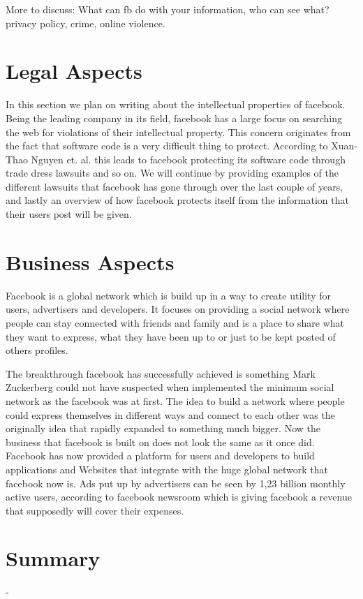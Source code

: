 \documentclass[conference]{IEEEtran}
\begin{document}
More to discuss:
What can fb do with your information, who can see what? privacy policy, crime,
online violence.

\section{Legal Aspects}
\label{legal}
In this section we plan on writing about the intellectual properties of
facebook. Being the leading company in its field, facebook has a large focus on
searching the web for violations of their intellectual property. This concern
originates from the fact that software code is a very difficult thing to
protect. According to  Xuan-Thao Nguyen et. al. this leads to facebook
protecting its software code through trade dress lawsuits and so on. We will
continue by providing examples of the different lawsuits that facebook has gone
through over the last couple of years, and lastly an overview of how facebook
protects itself from the information that their users post will be given.

\section{Business Aspects}
\label{financial}
Facebook is a global network which is build up in a way to create utility for
users, advertisers and developers. It focuses on providing a social network
where people can stay connected with friends and family and is a place to share
what they want to express, what they have been up to or just to be kept posted
of others profiles. 

The breakthrough facebook has successfully achieved is something Mark
Zuckerberg could not have suspected when implemented the minimum social network
as the facebook was at first. The idea to build a network where people could
express themselves in different ways and connect to each other was the
originally idea that rapidly expanded to something much bigger. Now the
business that facebook is built on does not look the same as it once did.
Facebook has now provided a platform for users and developers to build
applications and Websites that integrate with the huge global network that
facebook now is. Ads put up by advertisers can be seen by 1,23 billion monthly
active users, according to facebook newsroom which is giving facebook a revenue
that supposedly will cover their expenses.

\section{Summary}
-
\end{document}
